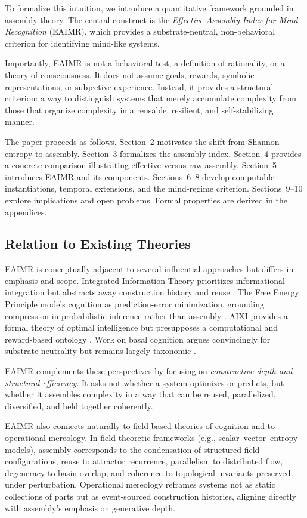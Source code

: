 \documentclass[11pt,letterpaper]{article}
\begin{document}
To formalize this intuition, we introduce a quantitative framework grounded in assembly theory. The central construct is the \emph{Effective Assembly Index for Mind Recognition} (EAIMR), which provides a substrate-neutral, non-behavioral criterion for identifying mind-like systems.

Importantly, EAIMR is not a behavioral test, a definition of rationality, or a theory of consciousness. It does not assume goals, rewards, symbolic representations, or subjective experience. Instead, it provides a structural criterion: a way to distinguish systems that merely accumulate complexity from those that organize complexity in a reusable, resilient, and self-stabilizing manner.

The paper proceeds as follows. Section~2 motivates the shift from Shannon entropy to assembly. Section~3 formalizes the assembly index. Section~4 provides a concrete comparison illustrating effective versus raw assembly. Section~5 introduces EAIMR and its components. Sections~6--8 develop computable instantiations, temporal extensions, and the mind-regime criterion. Sections~9--10 explore implications and open problems. Formal properties are derived in the appendices.

\subsection{Relation to Existing Theories}

EAIMR is conceptually adjacent to several influential approaches but differs in emphasis and scope. Integrated Information Theory prioritizes informational integration but abstracts away construction history and reuse \parencite{tononi2004}. The Free Energy Principle models cognition as prediction-error minimization, grounding compression in probabilistic inference rather than assembly \parencite{friston2010}. AIXI provides a formal theory of optimal intelligence but presupposes a computational and reward-based ontology \parencite{hutter2005}. Work on basal cognition argues convincingly for substrate neutrality but remains largely taxonomic \parencite{levin2019}.

EAIMR complements these perspectives by focusing on \emph{constructive depth and structural efficiency}. It asks not whether a system optimizes or predicts, but whether it assembles complexity in a way that can be reused, parallelized, diversified, and held together coherently.

EAIMR also connects naturally to field-based theories of cognition and to operational mereology. In field-theoretic frameworks (e.g., scalar--vector--entropy models), assembly corresponds to the condensation of structured field configurations, reuse to attractor recurrence, parallelism to distributed flow, degeneracy to basin overlap, and coherence to topological invariants preserved under perturbation. Operational mereology reframes systems not as static collections of parts but as event-sourced construction histories, aligning directly with assembly’s emphasis on generative depth.
\end{document}
